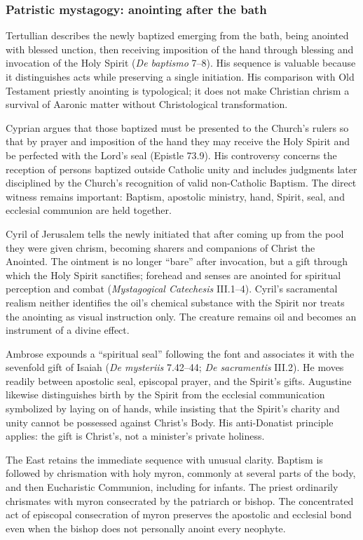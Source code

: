 \subsubsection{Patristic mystagogy: anointing after the bath}

Tertullian describes the newly baptized emerging from the bath, being anointed with blessed unction, then receiving imposition of the hand through blessing and invocation of the Holy Spirit (\emph{De baptismo} 7--8). His sequence is valuable because it distinguishes acts while preserving a single initiation. His comparison with Old Testament priestly anointing is typological; it does not make Christian chrism a survival of Aaronic matter without Christological transformation.

Cyprian argues that those baptized must be presented to the Church's rulers so that by prayer and imposition of the hand they may receive the Holy Spirit and be perfected with the Lord's seal (Epistle 73.9). His controversy concerns the reception of persons baptized outside Catholic unity and includes judgments later disciplined by the Church's recognition of valid non-Catholic Baptism. The direct witness remains important: Baptism, apostolic ministry, hand, Spirit, seal, and ecclesial communion are held together.

Cyril of Jerusalem tells the newly initiated that after coming up from the pool they were given chrism, becoming sharers and companions of Christ the Anointed. The ointment is no longer ``bare'' after invocation, but a gift through which the Holy Spirit sanctifies; forehead and senses are anointed for spiritual perception and combat (\emph{Mystagogical Catechesis} III.1--4). Cyril's sacramental realism neither identifies the oil's chemical substance with the Spirit nor treats the anointing as visual instruction only. The creature remains oil and becomes an instrument of a divine effect.

Ambrose expounds a ``spiritual seal'' following the font and associates it with the sevenfold gift of Isaiah (\emph{De mysteriis} 7.42--44; \emph{De sacramentis} III.2). He moves readily between apostolic seal, episcopal prayer, and the Spirit's gifts. Augustine likewise distinguishes birth by the Spirit from the ecclesial communication symbolized by laying on of hands, while insisting that the Spirit's charity and unity cannot be possessed against Christ's Body. His anti-Donatist principle applies: the gift is Christ's, not a minister's private holiness.

The East retains the immediate sequence with unusual clarity. Baptism is followed by chrismation with holy myron, commonly at several parts of the body, and then Eucharistic Communion, including for infants. The priest ordinarily chrismates with myron consecrated by the patriarch or bishop. The concentrated act of episcopal consecration of myron preserves the apostolic and ecclesial bond even when the bishop does not personally anoint every neophyte.

